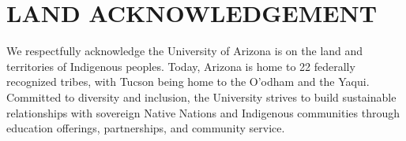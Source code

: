 \chapter{LAND ACKNOWLEDGEMENT}
We respectfully acknowledge the University of Arizona is on the land and territories of Indigenous peoples.
Today, Arizona is home to 22 federally recognized tribes, with Tucson being home to the O'odham and the Yaqui.
Committed to diversity and inclusion, the University strives to build sustainable relationships with sovereign Native Nations and Indigenous communities through education offerings, partnerships, and community service.
